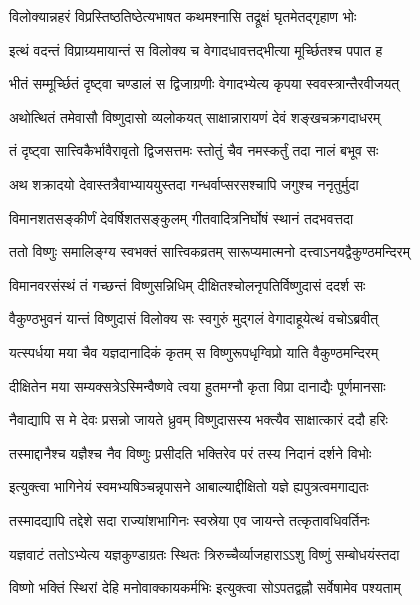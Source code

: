 \twolineshloka
{विलोक्यान्नहरं विप्रस्तिष्ठतिष्ठेत्यभाषत}
{कथमश्नासि तद्रूक्षं घृतमेतद्गृहाण भोः} %

\twolineshloka
{इत्थं वदन्तं विप्राग्र्यमायान्तं स विलोक्य च}
{वेगादधावत्तद्भीत्या मूर्च्छितश्च पपात ह} %

\twolineshloka
{भीतं सम्मूर्च्छितं दृष्ट्वा चण्डालं स द्विजाग्रणीः}
{वेगादभ्येत्य कृपया स्ववस्त्रान्तैरवीजयत्} %

\twolineshloka
{अथोत्थितं तमेवासौ विष्णुदासो व्यलोकयत्}
{साक्षान्नारायणं देवं शङ्खचक्रगदाधरम्} %

\twolineshloka
{तं दृष्ट्वा सात्त्विकैर्भावैरावृतो द्विजसत्तमः}
{स्तोतुं चैव नमस्कर्तुं तदा नालं बभूव सः} %

\twolineshloka
{अथ शक्रादयो देवास्तत्रैवाभ्याययुस्तदा}
{गन्धर्वाप्सरसश्चापि जगुश्च ननृतुर्मुदा} %

\twolineshloka
{विमानशतसङ्कीर्णं देवर्षिशतसङ्कुलम्}
{गीतवादित्रनिर्घोषं स्थानं तदभवत्तदा} %

\twolineshloka
{ततो विष्णुः समालिङ्ग्य स्वभक्तं सात्त्विकव्रतम्}
{सारूप्यमात्मनो दत्त्वाऽनयद्वैकुण्ठमन्दिरम्} %

\twolineshloka
{विमानवरसंस्थं तं गच्छन्तं विष्णुसन्निधिम्}
{दीक्षितश्चोलनृपतिर्विष्णुदासं ददर्श सः} %

\twolineshloka
{वैकुण्ठभुवनं यान्तं विष्णुदासं विलोक्य सः}
{स्वगुरुं मुद्गलं वेगादाहूयेत्थं वचोऽब्रवीत्} %


\twolineshloka
{यत्स्पर्धया मया चैव यज्ञदानादिकं कृतम्}
{स विष्णुरूपधृग्विप्रो याति वैकुण्ठमन्दिरम्} %

\twolineshloka
{दीक्षितेन मया सम्यक्सत्रेऽस्मिन्वैष्णवे त्वया}
{हुतमग्नौ कृता विप्रा दानाद्यैः पूर्णमानसाः} %

\twolineshloka
{नैवाद्यापि स मे देवः प्रसन्नो जायते ध्रुवम्}
{विष्णुदासस्य भक्त्यैव साक्षात्कारं ददौ हरिः} %

\twolineshloka
{तस्माद्दानैश्च यज्ञैश्च नैव विष्णुः प्रसीदति}
{भक्तिरेव परं तस्य निदानं दर्शने विभोः} %


\twolineshloka
{इत्युक्त्वा भागिनेयं स्वमभ्यषिञ्चन्नृपासने}
{आबाल्याद्दीक्षितो यज्ञे ह्यपुत्रत्वमगाद्यतः} %


\twolineshloka
{तस्मादद्यापि तद्देशे सदा राज्यांशभागिनः}
{स्वस्रेया एव जायन्ते तत्कृतावधिवर्तिनः} %

\twolineshloka
{यज्ञवाटं ततोऽभ्येत्य यज्ञकुण्डाग्रतः स्थितः}
{त्रिरुच्चैर्व्याजहाराऽऽशु विष्णुं सम्बोधयंस्तदा} %

\twolineshloka
{विष्णो भक्तिं स्थिरां देहि मनोवाक्कायकर्मभिः}
{इत्युक्त्वा सोऽपतद्वह्नौ सर्वेषामेव पश्यताम्} %

